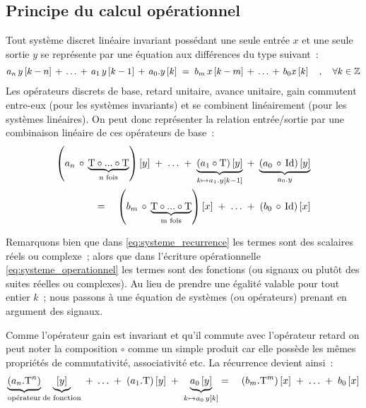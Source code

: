 \subsection{Principe du calcul opérationnel}
\label{sec:calcul_operationnel}
Tout système discret linéaire invariant possédant une seule entrée $x$ et
une seule sortie $y$ se représente par une équation aux différences du
type suivant~:
\begin{eqnarray}
  \label{eq:systeme_recurrence}
  a_n\,y\left[k-n\right] \,+\, \ldots  \,+\,  a_1\,y\left[k-1\right] \,+\, a_0.y\left[k\right] \;=\; b_m\,x\left[k-m\right] \,+\, \ldots \,+\, b_0 x\left[k\right] \quad,\quad \forall k\in\mathbb{Z}
\end{eqnarray}
Les opérateurs discrets de base, retard unitaire, avance unitaire,
gain commutent entre-eux (pour les systèmes invariants) et se combinent
linéairement (pour les systèmes linéaires). On peut donc représenter la
relation entrée/sortie par une combinaison linéaire de ces opérateurs
de base~:
\begin{eqnarray}
  \label{eq:systeme_operationnel}
  \left(a_n\,\circ\,\underbrace{\mathrm{T}\circ...\circ \mathrm{T}}_{\text{n fois}}\right)\left[y\right]\; +\; \ldots \;+\; \underbrace{\left(a_1\circ\mathrm{T}\right)\left[y\right]}_{k\mapsto a_1.y\left[k-1\right]} \;+\; \underbrace{\left(a_0 \,\circ\, \mathrm{Id}\right)\left[y\right]}_{a_0.y} \\
  =\quad \left(b_m\,\circ\,\underbrace{\mathrm{T}\circ...\circ \mathrm{T}}_{\text{m fois}}\right)\left[x\right] \;+\; \ldots \;+\; \left(b_0 \,\circ\,\mathrm{Id}\right)\left[x\right]
\end{eqnarray}

\begin{remarque}
  Remarquons bien que dans \eqref{eq:systeme_recurrence} les termes
  sont des scalaires réels ou complexe~; alors que dans l'écriture
  opérationnelle \eqref{eq:systeme_operationnel} les termes sont des
  fonctions (ou signaux ou plutôt des suites réelles ou complexes). Au
  lieu de prendre une égalité valable pour tout entier $k$~; nous
  passons à une équation de systèmes (ou opérateurs) prenant en
  argument des signaux.
\end{remarque}


Comme l'opérateur gain est invariant et qu'il commute avec l'opérateur
retard on peut noter la composition $\circ$ comme un simple produit
car elle possède les mêmes propriétés de commutativité, associativité
etc. La récurrence devient ainsi~:
\begin{eqnarray}
 \underbrace{\left(a_n.\mathrm{T}^n\right)}_{\text{opérateur}}\underbrace{\left[y\right]}_{\text{de fonction}}\; +\; \ldots \;+\; \left(a_1.\mathrm{T}\right)\left[y\right] \;+\; \underbrace{a_0\left[y\right]}_{k\mapsto a_0\,y\left[k\right]}  = \quad \left(b_m.\mathrm{T}^m\right)\left[x\right] \;+\; \ldots \;+\; b_0\left[x\right]
\end{eqnarray}

